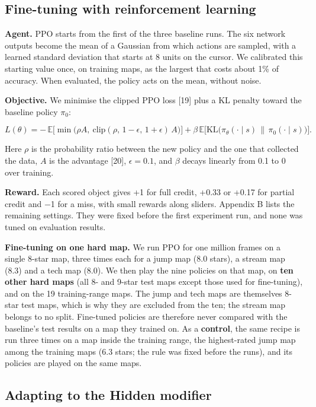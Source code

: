 \documentclass[10pt,a4paper]{article}
\begin{document}
\subsection{Fine-tuning with reinforcement learning}

\textbf{Agent.} PPO starts from the first of the three baseline runs. The six network outputs become the mean of a Gaussian from which actions are sampled, with a learned standard deviation that starts at 8 units on the cursor. We calibrated this starting value once, on training maps, as the largest that costs about 1\% of accuracy. When evaluated, the policy acts on the mean, without noise.


\textbf{Objective.} We minimise the clipped PPO loss [19] plus a KL penalty toward the baseline policy $\pi_0$:


\[L(\theta) = -\,\mathbb{E}\big[\min\big(\rho A,\ \mathrm{clip}(\rho,\, 1-\epsilon,\, 1+\epsilon)\, A\big)\big] + \beta\, \mathbb{E}\big[\mathrm{KL}\big(\pi_\theta(\cdot \mid s)\, \|\, \pi_0(\cdot \mid s)\big)\big].\]

Here $\rho$ is the probability ratio between the new policy and the one that collected the data, $A$ is the advantage [20], $\epsilon = 0.1$, and $\beta$ decays linearly from 0.1 to 0 over training.


\textbf{Reward.} Each scored object gives +1 for full credit, +0.33 or +0.17 for partial credit and $-$1 for a miss, with small rewards along sliders. Appendix B lists the remaining settings. They were fixed before the first experiment run, and none was tuned on evaluation results.


\textbf{Fine-tuning on one hard map.} We run PPO for one million frames on a single 8-star map, three times each for a jump map (8.0 stars), a stream map (8.3) and a tech map (8.0). We then play the nine policies on that map, on \textbf{ten other hard maps} (all 8- and 9-star test maps except those used for fine-tuning), and on the 19 training-range maps. The jump and tech maps are themselves 8-star test maps, which is why they are excluded from the ten; the stream map belongs to no split. Fine-tuned policies are therefore never compared with the baseline's test results on a map they trained on. As a \textbf{control}, the same recipe is run three times on a map inside the training range, the highest-rated jump map among the training maps (6.3 stars; the rule was fixed before the runs), and its policies are played on the same maps.


\subsection{Adapting to the Hidden modifier}
\end{document}

